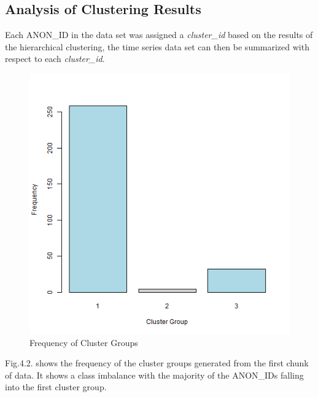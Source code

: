 \subsection{Analysis of Clustering Results}
Each ANON\_ID in the data set was assigned a \textit{cluster\_id} based on the results of the hierarchical clustering, the time series data set can then be summarized with respect to each \textit{cluster\_id}.

\begin{figure}[H]
\centering     
\includegraphics[width=1\textwidth]{Figures/results/cluster_bar.png}
\caption{Frequency of Cluster Groups}
\label{fig:Dendrogram}
\end{figure} 

Fig.4.2. shows the frequency of the cluster groups generated from the first chunk of data. It shows a class imbalance with the majority of the ANON\_IDs falling into the first cluster group.

